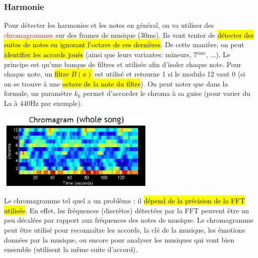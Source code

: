 \documentclass[letterpaper, 12pt]{article}
\newcommand{\alinea}{
\hspace*{0.5cm}}
\newcommand{\red}[1]{
	\textcolor{red}{#1}}
\begin{document}
			\subsubsection{Harmonie}
				\alinea Pour détecter les harmonies et les notes en général, on va utiliser des \red{chromagrammes} sur des 
					frames de musique (30ms). Ils vont tenter de 
					\hl{détecter des suites de notes en ignorant l'octave de ces dernières}. De cette manière, on peut \hl{identifier les
					accords joués} (ainsi que leurs variantes: mineurs, 7$^{\text{\`eme}}$, ...). Le principe est qu'une banque de filtres
					et utilisée afin d'isoler chaque note. Pour chaque note, un \hl{filtre $B(x)$} est utilisé et retourne 1 si le modulo 12 
					vaut 0 (si on se trouve à une \hl{octave de la note du filtre}). On peut noter que dans la formule, un paramètre $k_0$
					permet d'accorder le chroma à sa guise (pour varier du La à 440Hz par exemple).
				\begin{center}
					\includegraphics[width=3in]{Images/chroma}
				\end{center}
				\alinea Le chromagramme tel quel a un problème : il \hl{dépend de la précision de la FFT utilisée}. En effet, les fréquences
					(discrètes) détectées par la FFT peuvent être un peu décalées par rapport aux fréquences des notes de musique.
					Le chromagramme peut être utilisé pour reconnaître les accords, la clé de la musique, les émotions données par la musique,
					ou encore pour analyser les musiques qui vont bien ensemble (utilisent la même suite d'accord).
\end{document}
